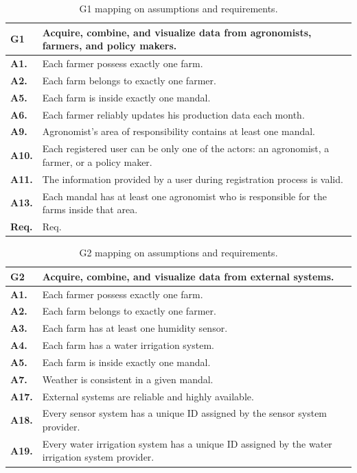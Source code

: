 \begin{table}[H]
    \centering
    \begin{tabularx}{\linewidth}{lX} \toprule
        \textbf{G1} & Acquire, combine, and visualize data from agronomists, farmers, and policy makers. \\ 
        \midrule
        \textbf{A1.} & Each farmer possess exactly one farm.\\
        \textbf{A2.} & Each farm belongs to exactly one farmer.\\ 
        \textbf{A5.} & Each farm is inside exactly one mandal.\\ 
        \textbf{A6.} & Each farmer reliably updates his production data each month.\\ 
        \textbf{A9.} & Agronomist's area of responsibility contains at least one mandal.\\ 
        \textbf{A10.} & Each registered user can be only one of the actors: an agronomist, a farmer, or a policy maker.\\ 
        \textbf{A11.} & The information provided by a user during registration process is valid.\\ 
        \textbf{A13.} & Each mandal has at least one agronomist who is responsible for the farms inside that area.\\ 
        \midrule
        \textbf{Req.} & Req.\\
        \bottomrule
    \end{tabularx}
    \caption{G1 mapping on assumptions and requirements.}
\end{table}

\begin{table}[H]
    \centering
    \begin{tabularx}{\linewidth}{lX} \toprule
        \textbf{G2} & Acquire, combine, and visualize data from external systems. \\ 
        \midrule
        \textbf{A1.} & Each farmer possess exactly one farm.\\
        \textbf{A2.} & Each farm belongs to exactly one farmer.\\ 
        \textbf{A3.} & Each farm has at least one humidity sensor.\\ 
        \textbf{A4.} & Each farm has a water irrigation system.\\ 
        \textbf{A5.} & Each farm is inside exactly one mandal.\\ 
        \textbf{A7.} & Weather is consistent in a given mandal.\\ 
        \textbf{A17.} & External systems are reliable and highly available.\\
        \textbf{A18.} & Every sensor system has a unique ID assigned by the sensor system provider. \\
        \textbf{A19.} & Every water irrigation system has a unique ID assigned by the water irrigation system provider. \\
        \midrule
        \bottomrule
    \end{tabularx}
    \caption{G2 mapping on assumptions and requirements.}
\end{table}

